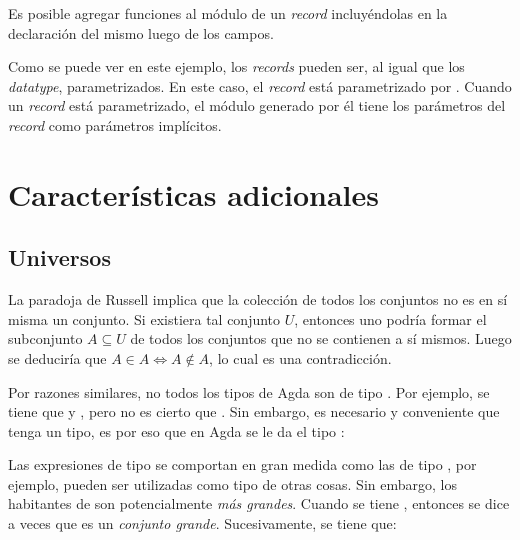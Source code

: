 Es posible agregar funciones al módulo de un \textit{record} incluyéndolas en la declaración del mismo luego de los campos. 


Como se puede ver en este ejemplo, los \textit{records} pueden ser, al igual que los \textit{datatype}, parametrizados. En este caso, el \textit{record}  está parametrizado por . Cuando un \textit{record} está parametrizado, el módulo generado por él tiene los parámetros del \textit{record} como parámetros implícitos.

\section{Características adicionales}\label{agda:additional}

\subsection{Universos}\label{additional:univ}

La paradoja de Russell implica que la colección de todos los conjuntos no es en sí misma un conjunto. Si existiera tal conjunto $U$, entonces uno podría formar el subconjunto $A \subseteq U$ de todos los conjuntos que no se contienen a sí mismos. Luego se deduciría que $A \in A \iff A \notin A$, lo cual es una contradicción.

Por razones similares, no todos los tipos de Agda son de tipo . Por ejemplo, se tiene que  \AgdaSymbol{:}  y  \AgdaSymbol{:} , pero no es cierto que  \AgdaSymbol{:} . Sin embargo, es necesario y conveniente que  tenga un tipo, es por eso que en Agda se le da el tipo :

 \AgdaSymbol{:} 

Las expresiones de tipo  se comportan en gran medida como las de tipo , por ejemplo, pueden ser utilizadas como tipo de otras cosas. Sin embargo, los habitantes de  son potencialmente \textit{más grandes}. Cuando se tiene  \AgdaSymbol{:} , entonces se dice a veces que  es un \textit{conjunto grande}. Sucesivamente, se tiene que:

